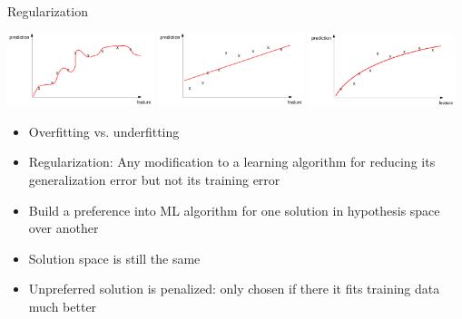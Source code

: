 \begin{vbframe}{Regularization}
\begin{center}
\includegraphics[width = 0.32\textwidth]{./figure/prediction_overfit}
\includegraphics[width = 0.32\textwidth]{./figure/prediction_underfit}
\includegraphics[width = 0.32\textwidth]{./figure/prediction_smooth}
\end{center}
\begin{itemize}
\item Overfitting vs. underfitting
\item Regularization: Any modification to
a learning algorithm for reducing its generalization error but not its training error
\item Build a preference into ML algorithm for one solution in hypothesis space over another
\item Solution space is still the same
\item Unpreferred solution is penalized: only chosen if there it fits training data much better
\end{itemize}
\begin{center}
\end{center}

\vfill

\end{vbframe}


